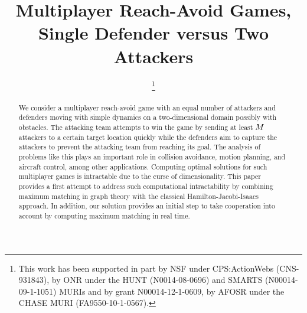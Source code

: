 \documentclass[letterpaper, 10 pt, conference]{ieeeconf}  %
\title{\LARGE \bf
Multiplayer Reach-Avoid Games, Single Defender versus Two Attackers
}
\author{%
\thanks{This work has been supported in part by NSF under CPS:ActionWebs (CNS-931843), by ONR under the HUNT (N0014-08-0696) and SMARTS (N00014-09-1-1051) MURIs and by grant N00014-12-1-0609, by AFOSR under the CHASE MURI (FA9550-10-1-0567).}%
}
\numberwithin{algorithm}{section}
\begin{document}
\maketitle

\thispagestyle{empty}
\pagestyle{empty}

\begin{abstract}
We consider a multiplayer reach-avoid game with an equal number of attackers and defenders moving with simple dynamics on a two-dimensional domain possibly with obstacles. The attacking team attempts to win the game by sending at least $M$ attackers to a certain target location quickly while the defenders aim to capture the attackers to prevent the attacking team from reaching its goal.  The analysis of problems like this plays an important role in collision avoidance, motion planning, and aircraft control, among other applications. Computing optimal solutions for such multiplayer games is intractable due to the curse of dimensionality. This paper provides a first attempt to address such computational intractability by combining maximum matching in graph theory with the classical Hamilton-Jacobi-Isaacs approach. In addition, our solution provides an initial step to take cooperation into account by computing maximum matching in real time.
\end{abstract}









\end{document}
